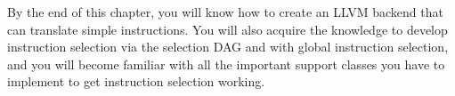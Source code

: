 By the end of this chapter, you will know how to create an LLVM backend that can translate simple instructions. You will also acquire the knowledge to develop instruction selection via the selection DAG and with global instruction selection, and you will become familiar with all the important support classes you have to implement to get instruction selection working.









































